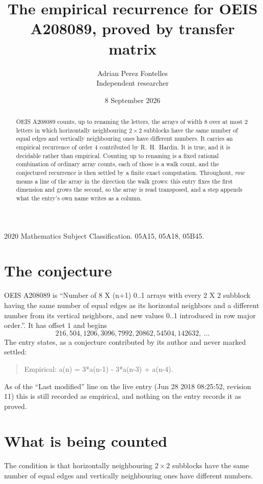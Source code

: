 \documentclass[11pt,a4paper]{article}
\title{The empirical recurrence for OEIS A208089, proved by transfer matrix}
\author{Adrian Perez Fontelles\\ \small Independent researcher}
\date{8 September 2026}
\theoremstyle{plain}
\theoremstyle{definition}
\begin{document}
\maketitle

\begin{abstract}
OEIS A208089 counts, up to renaming the letters, the arrays of width $8$ over at most $2$
letters in which horizontally neighbouring $2\times2$ subblocks have the same number of equal edges and vertically neighbouring ones have different numbers. It carries an empirical recurrence of order $4$ contributed by
R.~H.~Hardin. It is true, and it is decidable rather than empirical. Counting up to renaming is
a fixed rational combination of ordinary array counts, each of those is a walk count, and the
conjectured recurrence is then settled by a finite exact computation.
 Throughout, \emph{row} means a line of the array in the direction the walk grows: this entry fixes the first dimension and grows the second, so the array is read transposed, and a step appends what the entry's own name writes as a column.\end{abstract}

\noindent\small 2020 Mathematics Subject Classification. 05A15, 05A18, 05B45.\normalsize

\section{The conjecture}

OEIS A208089 is ``Number of 8 X (n+1) 0..1 arrays with every 2 X 2 subblock having the same number of equal edges as its horizontal neighbors and a different number from its vertical neighbors, and new values 0..1 introduced in row major order.''. It has offset $1$ and begins
\[
216, 504, 1206, 3096, 7992, 20862, 54504, 142632,\ \dots
\]
The entry states, as a conjecture contributed by its author and never marked settled:
\begin{quote}
Empirical: a(n) = 3*a(n-1) - 3*a(n-3) + a(n-4).
\end{quote}
As of the ``Last modified'' line on the live entry (Jun 28 2018 08:25:52, revision 11) this is still
recorded as empirical, and nothing on the entry records it as proved.

\section{What is being counted}

The condition is that horizontally neighbouring $2\times2$ subblocks have the same number of equal edges and vertically neighbouring ones have different numbers.
\end{document}
